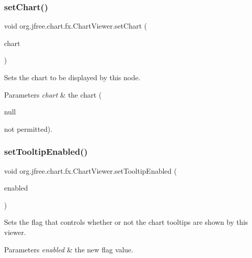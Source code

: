 \subsubsection{\texorpdfstring{set\+Chart()}{setChart()}}
{\footnotesize\ttfamily void org.\+jfree.\+chart.\+fx.\+Chart\+Viewer.\+set\+Chart (\begin{DoxyParamCaption}\item[{\mbox{\hyperlink{classorg_1_1jfree_1_1chart_1_1_j_free_chart}{J\+Free\+Chart}}}]{chart }\end{DoxyParamCaption})}

Sets the chart to be displayed by this node.


\begin{DoxyParams}{Parameters}
{\em chart} & the chart (
\begin{DoxyCode}
null 
\end{DoxyCode}
 not permitted). \\
\hline
\end{DoxyParams}
\mbox{\label{classorg_1_1jfree_1_1chart_1_1fx_1_1_chart_viewer_a3824effec5e412cfb822ee248946e550}} 
\subsubsection{\texorpdfstring{set\+Tooltip\+Enabled()}{setTooltipEnabled()}}
{\footnotesize\ttfamily void org.\+jfree.\+chart.\+fx.\+Chart\+Viewer.\+set\+Tooltip\+Enabled (\begin{DoxyParamCaption}\item[{boolean}]{enabled }\end{DoxyParamCaption})}

Sets the flag that controls whether or not the chart tooltips are shown by this viewer.


\begin{DoxyParams}{Parameters}
{\em enabled} & the new flag value. \\
\hline
\end{DoxyParams}
\mbox{\label{classorg_1_1jfree_1_1chart_1_1fx_1_1_chart_viewer_a300e2e9eaa9eb944b9c4d3b84fbd9d33}} 
